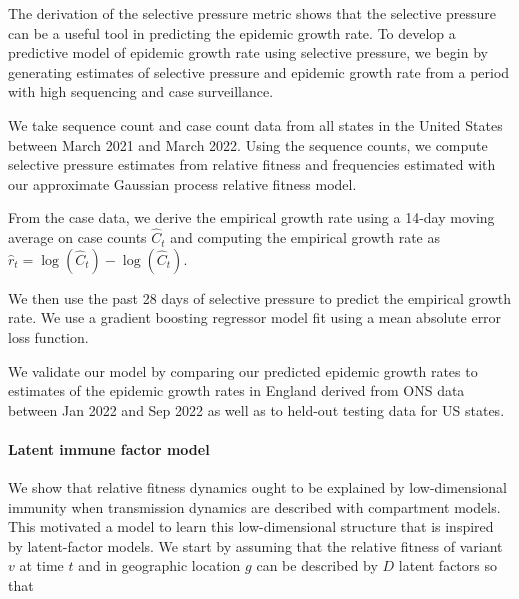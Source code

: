 \documentclass[12pt,oneside,letterpaper]{article}
\begin{document}
The derivation of the selective pressure metric shows that the selective pressure can be a useful tool in predicting the epidemic growth rate.
To develop a predictive model of epidemic growth rate using selective pressure, we begin by generating estimates of selective pressure and epidemic growth rate from a period with high sequencing and case surveillance.

We take sequence count and case count data from all states in the United States between March 2021 and March 2022.
Using the sequence counts, we compute selective pressure estimates from relative fitness and frequencies estimated with our approximate Gaussian process relative fitness model.

From the case data, we derive the empirical growth rate using a 14-day moving average on case counts $\hat{C}_{t}$ and computing the empirical growth rate as $\hat{r}_{t} = \log(\hat{C}_{t}) - \log(\hat{C}_{t})$.

We then use the past 28 days of selective pressure to predict the empirical growth rate.
We use a gradient boosting regressor model fit using a mean absolute error loss function.

We validate our model by comparing our predicted epidemic growth rates to estimates of the epidemic growth rates in England derived from ONS data between Jan 2022 and Sep 2022 as well as to held-out testing data for US states.


\paragraph{Latent immune factor model}%

We show that relative fitness dynamics ought to be explained by low-dimensional immunity when transmission dynamics are described with compartment models.
This motivated a model to learn this low-dimensional structure that is inspired by latent-factor models.
We start by assuming that the relative fitness of variant $v$ at time $t$ and in geographic location $g$ can be described by $D$ latent factors so that
\end{document}
